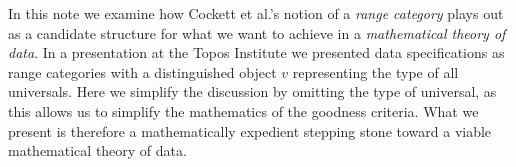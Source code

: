 In this note we examine how Cockett et al.'s notion of a \emph{range category} plays out as a candidate structure for what we want to achieve in a \textit{mathematical theory of data}. In a presentation at the Topos Institute 
we presented data specifications as range categories with a distinguished object $v$ representing the type of all universals. Here we simplify the discussion by omitting the type of universal, 
as this allows us to simplify the mathematics of the goodness criteria.
What we present is therefore a mathematically expedient stepping stone toward a viable mathematical theory of data.
